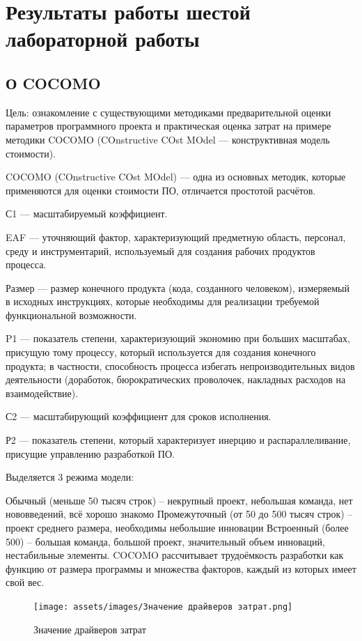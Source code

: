 \section{Результаты работы шестой лабораторной работы}

\subsection{О COCOMO}

Цель: ознакомление с существующими методиками предварительной оценки параметров программного проекта и практическая оценка затрат на примере методики COCOMO (COnstructive COst MOdel — конструктивная модель стоимости).

COCOMO (COnstructive COst MOdel) –-- одна из основных методик, которые применяются для оценки стоимости ПО, отличается простотой расчётов. 

 
С1 --- масштабируемый коэффициент.

EAF --- уточняющий фактор, характеризующий предметную область, персонал, среду и инструментарий, используемый для создания рабочих продуктов процесса. 

Размер --- размер конечного продукта (кода, созданного человеком), измеряемый в исходных инструкциях, которые необходимы для реализации требуемой функциональной возможности.

P1 --- показатель степени, характеризующий экономию при больших масштабах, присущую тому процессу, который используется для создания конечного продукта; в частности, способность процесса избегать непроизводительных видов деятельности (доработок, бюрократических проволочек, накладных расходов на взаимодействие).

 
С2 --- масштабирующий коэффициент для сроков исполнения.

Р2 --- показатель степени, который характеризует инерцию и распараллеливание, присущие управлению разработкой ПО.

Выделяется 3 режима модели:

Обычный (меньше 50 тысяч строк) – некрупный проект, небольшая команда, нет нововведений, всё хорошо знакомо
Промежуточный (от 50 до 500 тысяч строк) – проект среднего размера, необходимы небольшие инновации
Встроенный (более 500) – большая команда, большой проект, значительный объем инноваций, нестабильные элементы.
COCOMO рассчитывает трудоёмкость разработки как функцию от размера программы и множества факторов, каждый из которых имеет свой вес.


\begin{figure}[ht!]
	\texttt{[image: assets/images/Значение драйверов затрат.png]}
	\label{fig:r2}
	\caption{Значение драйверов затрат}
\end{figure}
\FloatBarrier

